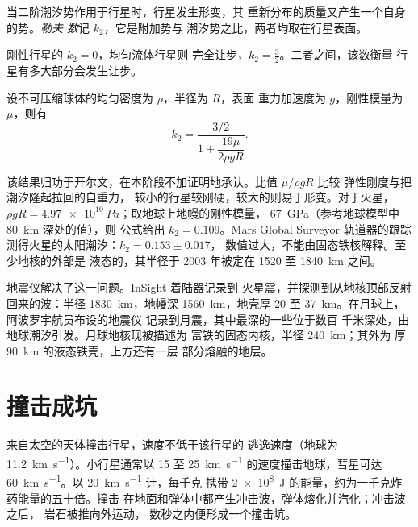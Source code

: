 \begin{definition}[勒夫数]\label{def:b3:planetary-interiors-surfaces:love-number}
当二阶潮汐势作用于行星时，行星发生形变，其
重新分布的质量又产生一个自身的势。\emph{勒夫
数}记 $k_2$，它是附加势与
潮汐势之比，两者均取在行星表面。
\end{definition}

刚性行星的 $k_2 = 0$，均匀流体行星则
完全让步，$k_2 = \tfrac32$。二者之间，该数衡量
行星有多大部分会发生让步。

\begin{proposition}[均匀弹性球的勒夫数]\label{prop:b3:planetary-interiors-surfaces:kelvin}
设不可压缩球体的均匀密度为 $\rho$，半径为 $R$，表面
重力加速度为 $g$，刚性模量为 $\mu$，则有
\[
  k_2 = \frac{3/2}{1 + \dfrac{19\mu}{2\rho g R}} .
\]
\end{proposition}

该结果归功于开尔文，在本阶段不加证明地承认。比值 $\mu/\rho gR$ 比较
弹性刚度与把潮汐隆起拉回的自重力，
较小的行星较刚硬，较大的则易于形变。对于火星，$\rho gR =
\qty{4.97e10}{Pa}$；取地球上地幔的刚性模量，
\qty{67}{GPa}（参考地球模型中 \qty{80}{km} 深处的值），则
公式给出 $k_2 = 0.109$。Mars Global Surveyor 轨道器的跟踪
测得火星的太阳潮汐：$k_2 = 0.153 \pm 0.017$，
数值过大，不能由固态铁核解释。至少地核的外部是
液态的，其半径于 2003 年被定在 1520 至 \qty{1840}{km} 之间。

地震仪解决了这一问题。InSight 着陆器记录到
火星震，并探测到从地核顶部反射回来的波：半径
\qty{1830}{km}，地幔深 \qty{1560}{km}，地壳厚 20 至
\qty{37}{km}。在月球上，阿波罗宇航员布设的地震仪
记录到月震，其中最深的一些位于数百
千米深处，由地球潮汐引发。月球地核现被描述为
富铁的固态内核，半径 \qty{240}{km}；其外为
厚 \qty{90}{km} 的液态铁壳，上方还有一层
部分熔融的地层。

\section{撞击成坑}\label{sec:b3:planetary-interiors-surfaces:impacts}

来自太空的天体撞击行星，速度不低于该行星的
逃逸速度（地球为 \qty{11.2}{km.s^{-1}}）。小行星通常以
15 至 \qty{25}{km.s^{-1}} 的速度撞击地球，彗星可达
\qty{60}{km.s^{-1}}。以 \qty{20}{km.s^{-1}} 计，每千克
携带 \qty{2e8}{J} 的能量，约为一千克炸药能量的五十倍。撞击
在地面和弹体中都产生冲击波，弹体熔化并汽化；冲击波之后，
岩石被推向外运动，
数秒之内便形成一个撞击坑。

